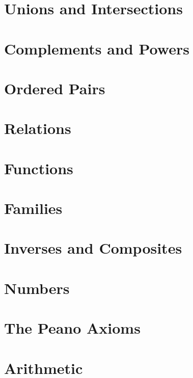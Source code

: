 \documentclass[fontsize=12pt,b5paper,pagesize=auto,openany]{book}
\theoremstyle{axiom}
\theoremstyle{exc}
\begin{document}
\chapter{Unions and Intersections}


\chapter{Complements and Powers} 


\chapter{Ordered Pairs}


\chapter{Relations}


\chapter{Functions}


\chapter{Families}


\chapter{Inverses and Composites}


\chapter{Numbers}


\chapter{The Peano Axioms}


\chapter{Arithmetic}
\label{ch:arithmetic}

\end{document}
